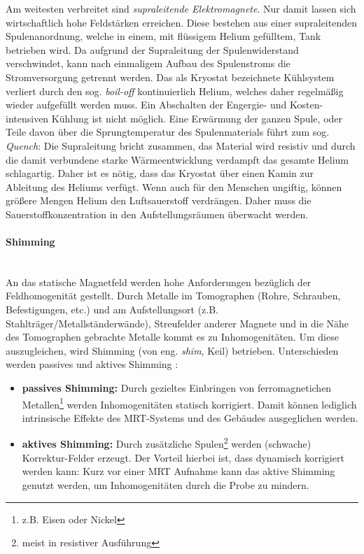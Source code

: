 Am weitesten verbreitet sind \textit{supraleitende Elektromagnete}. Nur damit lassen sich wirtschaftlich hohe Feldstärken erreichen. Diese bestehen aus einer supraleitenden Spulenanordnung, welche in einem, mit flüssigem Helium gefülltem, Tank betrieben wird. Da aufgrund der Supraleitung der Spulenwiderstand verschwindet, kann nach einmaligem Aufbau des Spulenstroms die Stromversorgung getrennt werden. Das als Kryostat bezeichnete Kühlsystem verliert durch den sog. \textit{boil-off} kontinuierlich Helium, welches daher regelmäßig wieder aufgefüllt werden muss. Ein Abschalten der Engergie- und Kosten-intensiven Kühlung ist nicht möglich. Eine Erwärmung der ganzen Spule, oder Teile davon über die Sprungtemperatur des Spulenmaterials führt zum sog. \textit{Quench}: Die Supraleitung bricht zusammen, das Material wird resistiv und durch die damit verbundene starke Wärmeentwicklung verdampft das gesamte Helium schlagartig. Daher ist es nötig, dass das Kryostat über einen Kamin zur Ableitung des Heliums verfügt. Wenn auch für den Menschen ungiftig, können größere Mengen Helium den Luftsauerstoff verdrängen. Daher muss die Sauerstoffkonzentration in den Aufstellungsräumen überwacht werden.

\paragraph{Shimming}\mbox{}\\
An das statische Magnetfeld werden hohe Anforderungen bezüglich der Feldhomogenität gestellt.
Durch Metalle im Tomographen (Rohre, Schrauben, Befestigungen, etc.) und am Aufstellungsort (z.B. Stahlträger/Metallständerwände), Streufelder anderer Magnete und in die Nähe des Tomographen gebrachte Metalle kommt es zu Inhomogenitäten.
Um diese auszugleichen, wird Shimming (von eng. \textit{shim}, Keil) betrieben. Unterschieden werden passives und aktives Shimming \cite{Lipton2008}:
\begin{itemize}
	\item \textbf{passives Shimming:} Durch gezieltes Einbringen von ferromagnetichen Metallen\footnote{z.B. Eisen oder Nickel} werden Inhomogenitäten statisch korrigiert. Damit können lediglich intrinsische Effekte des MRT-Systems und des Gebäudes ausgeglichen werden.
	\item \textbf{aktives Shimming:} Durch zusätzliche Spulen\footnote{meist in resistiver Ausführung} werden (schwache) Korrektur-Felder erzeugt. Der Vorteil hierbei ist, dass dynamisch korrigiert werden kann: Kurz vor einer MRT Aufnahme kann das aktive Shimming genutzt werden, um Inhomogenitäten  durch die Probe zu mindern.  
\end{itemize}

